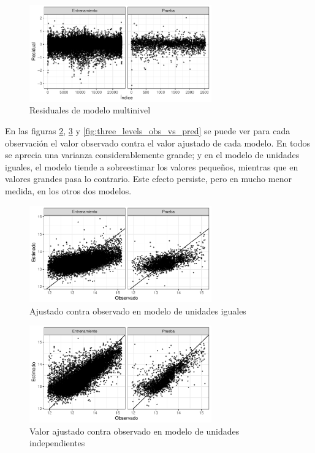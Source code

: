 \begin{figure}[H]
    \centering
    \includegraphics[width=0.7\textwidth]{images/three_levels_resids.pdf}
    \caption{Residuales de modelo multinivel}
    \label{fig:three_levels_resids}
\end{figure}

En las figuras \ref{fig:comp_pooling_obs_vs_pred}, \ref{fig:no_pooling_obs_vs_pred} y \ref{fig:three_levels_obs_vs_pred} se puede ver para cada observación el valor observado contra el valor ajustado de cada modelo. En todos se aprecia una varianza considerablemente grande; y en el modelo de unidades iguales, el modelo tiende a sobreestimar los valores pequeños, mientras que en valores grandes pasa lo contrario. Este efecto persiste, pero en mucho menor medida, en los otros dos modelos.

\begin{figure}[H]
    \centering
    \includegraphics[width=0.7\textwidth]{images/comp_pooling_obs_vs_pred.pdf}
    \caption{Ajustado contra observado en modelo de unidades iguales}
    \label{fig:comp_pooling_obs_vs_pred}
\end{figure}

\begin{figure}[H]
    \centering
    \includegraphics[width=0.7\textwidth]{images/no_pooling_obs_vs_pred.pdf}
    \caption{Valor ajustado contra observado en modelo de unidades independientes}
    \label{fig:no_pooling_obs_vs_pred}
\end{figure}


